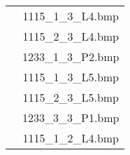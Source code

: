 \begin{table}
\begin{tabular}{ | c | c | }
                          & 1115\_1\_3\_L4.bmp \\
                          & 1115\_2\_3\_L4.bmp \\
                          & 1233\_1\_3\_P2.bmp \\
                          & 1115\_1\_3\_L5.bmp \\
                          & 1115\_2\_3\_L5.bmp \\
                          & 1233\_3\_3\_P1.bmp  \\
                          & 1115\_1\_2\_L4.bmp \\
      \hline
    \end{tabular}
  \end{table}






